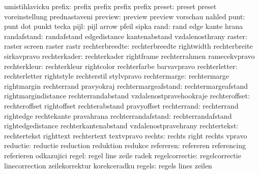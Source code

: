                        umistihlavicku
              prefix:  prefix               prefix               prefix
                       prefix
              preset:  preset               preset               voreinstellung
                       prednastaveni
             preview:  preview              preview              vorschau
                       nahled
                punt:  punt                 dot                  punkt
                       tecka
                pijl:  pijl                 arrow                pfeil
                       sipka
                rand:  rand                 edge                 kante
                       hrana
         randafstand:  randafstand          edgedistance         kantenabstand
                       vzdalenosthrany
              raster:  raster               screen               raster
                       rastr
      rechterbreedte:  rechterbreedte       rightwidth           rechterbreite
                       sirkavpravo
        rechterkader:  rechterkader         rightframe           rechterrahmen
                       ramecekvpravo
        rechterkleur:  rechterkleur         rightcolor           rechterfarbe
                       barvavpravo
       rechterletter:  rechterletter        rightstyle           rechterstil
                       stylvpravo
        rechtermarge:  rechtermarge         rightmargin          rechterrand
                       pravyokraj
 rechtermargeafstand:  rechtermargeafstand  rightmargindistance  rechterrandabstand
                       vzdalenostpravehookraje
       rechteroffset:  rechteroffset        rightoffset          rechterabstand
                       pravyoffset
         rechterrand:  rechterrand          rightedge            rechtekante
                       pravahrana
  rechterrandafstand:  rechterrandafstand   rightedgedistance    rechterkantenabstand
                       vzdalenostpravehrany
        rechtertekst:  rechtertekst         righttext            rechtertext
                       textvpravo
              rechts:  rechts               right                rechts
                       vpravo
            reductie:  reductie             reduction            reduktion
                       redukce
           refereren:  refereren            referencing          referieren
                       odkazujici
               regel:  regel                line                 zeile
                       radek
      regelcorrectie:  regelcorrectie       linecorrection       zeilekorrektur
                       korekceradku
              regels:  regels               lines                zeilen
